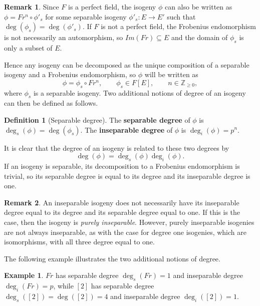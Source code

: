 \documentclass{article}
\newcommand{\Z}{\mathbb{Z}}
\newcommand{\rb}[1]{\left( #1 \right)}
\renewcommand{\sb}[1]{\left[ #1 \right]}
\theoremstyle{definition}\newtheorem*{definition}{Definition}
\theoremstyle{definition}\newtheorem*{example}{Example}
\theoremstyle{definition}\newtheorem*{remark}{Remark}
\begin{document}
\begin{remark}
Since $ F $ is a perfect field, the isogeny $ \phi $ can also be written as $ \phi = Fr^n \circ \phi'_s $ for some separable isogeny $ \phi'_s : E \to E' $ such that $ \deg\rb{\phi_s} = \deg\rb{\phi'_s} $. If $ F $ is not a perfect field, the Frobenius endomorphism is not necessarily an automorphism, so $ Im\rb{Fr} \subseteq E $ and the domain of $ \phi_s $ is only a subset of $ E $.
\end{remark}

Hence any isogeny can be decomposed as the unique composition of a separable isogeny and a Frobenius endomorphism, so $ \phi $ will be written as
$$ \phi = \phi_s \circ Fr^n, \qquad \phi_s \in F\sb{E}, \qquad n \in \Z_{\ge 0}, $$
where $ \phi_s $ is a separable isogeny. Two additional notions of degree of an isogeny can then be defined as follows.

\begin{definition}[Separable degree]
The \textbf{separable degree} of $ \phi $ is $ \deg_s\rb{\phi} = \deg\rb{\phi_s} $. The \textbf{inseparable degree} of $ \phi $ is $ \deg_i\rb{\phi} = p^n $.
\end{definition}

It is clear that the degree of an isogeny is related to these two degrees by
$$ \deg\rb{\phi} = \deg_s\rb{\phi}\deg_i\rb{\phi}. $$
If an isogeny is separable, its decomposition to a Frobenius endomorphism is trivial, so its separable degree is equal to its degree and its inseparable degree is one.

\begin{remark}
An inseparable isogeny does not necessarily have its inseparable degree equal to its degree and its separable degree equal to one. If this is the case, then the isogeny is \emph{purely inseparable}. However, purely inseparable isogenies are not always inseparable, as with the case for degree one isogenies, which are isomorphisms, with all three degree equal to one.
\end{remark}

The following example illustrates the two additional notions of degree.

\begin{example}
$ Fr $ has separable degree $ \deg_s\rb{Fr} = 1 $ and inseparable degree $ \deg_i\rb{Fr} = p $, while $ \sb{2} $ has separable degree $ \deg_s\rb{\sb{2}} = \deg\rb{\sb{2}} = 4 $ and inseparable degree $ \deg_i\rb{\sb{2}} = 1 $.
\end{example}
\end{document}

